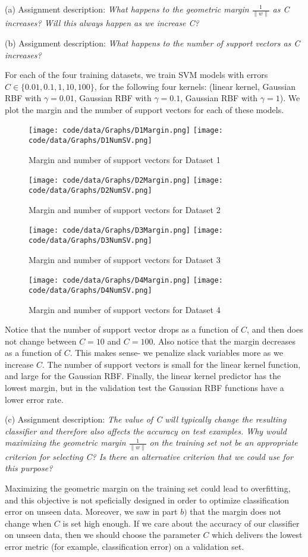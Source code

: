 \documentclass[10pt]{article}
\newcommand{\ds}{\displaystyle}
\begin{document}
(a) Assignment description: \emph{What happens to the geometric margin $\ds \frac{1}{\|w\|}$ as C increases? Will this always happen as we increase C?}

(b) Assignment description: \emph{What happens to the number of support vectors as C increases?}

For each of the four training datasets, we train SVM models with errors $\ds C \in \{0.01, 0.1, 1, 10, 100\}$, for the following four kernels: (linear kernel, Gaussian RBF with $\ds\gamma = 0.01$, Gaussian RBF with $\ds\gamma = 0.1$, Gaussian RBF with $\ds\gamma = 1$). We plot the margin and the number of support vectors for each of these models.
\begin{figure}[!ht]
\texttt{[image: code/data/Graphs/D1Margin.png]}
\texttt{[image: code/data/Graphs/D1NumSV.png]}
\caption{Margin and number of support vectors for Dataset 1}
\texttt{[image: code/data/Graphs/D2Margin.png]}
\texttt{[image: code/data/Graphs/D2NumSV.png]}
\caption{Margin and number of support vectors for Dataset 2}
\texttt{[image: code/data/Graphs/D3Margin.png]}
\texttt{[image: code/data/Graphs/D3NumSV.png]}
\caption{Margin and number of support vectors for Dataset 3}
\texttt{[image: code/data/Graphs/D4Margin.png]}
\texttt{[image: code/data/Graphs/D4NumSV.png]}
\caption{Margin and number of support vectors for Dataset 4}
\end{figure}

Notice that the number of support vector drops as a function of $\ds C$, and then does not change between $\ds C=10$ and $\ds C=100$. Also notice that the margin decreases as a function of $\ds C$. This makes sense- we penalize slack variables more as we increase $\ds C$. The number of support vectors is small for the linear kernel function, and large for the Gaussian RBF. Finally, the linear kernel predictor has the lowest margin, but in the validation test the Gaussian RBF functions have a lower error rate.

(c) Assignment description: \emph{The value of C will typically change the resulting classifier and therefore also affects the accuracy
on test examples. Why would maximizing the geometric margin $\ds \frac{1}{\|w\|}$ on the training set not be
an appropriate criterion for selecting C? Is there an alternative criterion that we could use for this
purpose?}

Maximizing the geometric margin on the training set could lead to overfitting, and this objective is not speficially designed in order to optimize classification error on unseen data. Moreover, we saw in part $\ds b)$ that the margin does not change when $\ds C$ is set high enough.
If we care about the accuracy of our classifier on unseen data, then we should choose the parameter $\ds C$ which delivers the lowest error metric (for example, classification error) on a validation set.
\end{document}
